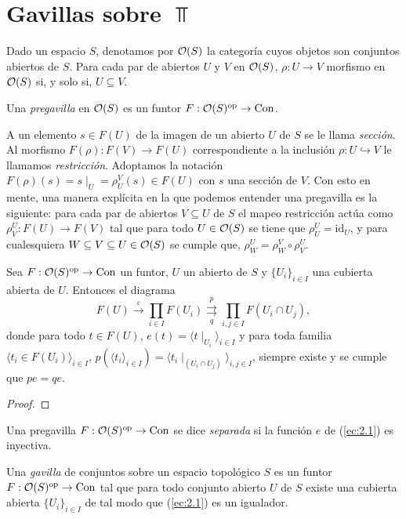 \section{Gavillas sobre $\Top$}
Dado un espacio $S$, denotamos por ${\mathcal O}(S)$ la categoría cuyos objetos son conjuntos abiertos de $S$. Para cada par de abiertos $U$ y $V$ en ${\mathcal O}(S)$, $\rho:U\to V$ morfismo en ${\mathcal O}(S)$ si, y solo si, $U\subseteq V$.
\begin{definition}[Pregavilla]
    Una \emph{pregavilla} en ${\mathcal O}(S)$ es un funtor $F:{\mathcal O}(S)^{\mathrm{op}}\to{\mathrm{Con}}$.
\end{definition}
A un elemento $s\in F(U)$ de la imagen de un abierto $U$ de $S$ se le llama \emph{sección}. Al morfismo $F(\rho):F(V)\to F(U)$ correspondiente a la inclusión $\rho:U\hookrightarrow V$ le llamamos \emph{restricción}. Adoptamos la notación $F(\rho)(s)=s\mid_U=\rho^V_U(s)\in F(U)$ con $s$ una sección de $V$. Con esto en mente, una manera explícita en la que podemos entender una pregavilla es la siguiente: para cada par de abiertos $V\subseteq U$ de $S$ el mapeo restricción actúa como $\rho_V^U: F(U)\to F(V)$ tal que para todo $U\in{\mathcal O}(S)$ se  tiene que $\rho_U^U=\mathrm{id}_U$, y para cualesquiera $W\subseteq V\subseteq U\in{\mathcal O}(S)$ se cumple que, $\rho_W^U=\rho_W^V\circ\rho_V^U$.
\begin{lema}
    Sea $F:{\mathcal O}(S)^{\mathrm{op}}\to{\mathrm{Con}}$ un funtor, $U$ un abierto de $S$ y $\{U_i\}_{i\in I}$ una cubierta abierta de $U$. Entonces el diagrama 
    \begin{equation}\label{ec:2.1}
        F(U)\xrightarrow{\varepsilon}\prod_{i\in I} F(U_i)\overset{p}{\underset{q}{\rightrightarrows}}\prod_{i,j\in I}F(U_i\cap U_j),
    \end{equation}
    donde para todo $t\in F(U)$, $e(t)=\langle t\mid_{U_i}\rangle_{i\in I}$ y para toda familia $\langle t_i\in F(U_i)\rangle_{i\in I}$, $p(\langle t_i\rangle_{i\in I})=\langle t_i\mid_{(U_i\cap U_j)}\rangle_{i,j\in I}$, siempre existe y se cumple que $pe=qe$.
\end{lema}
\begin{proof}

\end{proof}
\begin{definition} Una pregavilla $F:{\mathcal O}(S)^{{\mathrm{op}}}\to{\mathrm{Con}}$ se dice \emph{separada} si la función $e$ de (\ref{ec:2.1}) es inyectiva. 
\end{definition}
\begin{definition}[Gavilla]
    Una \emph{gavilla} de conjuntos sobre un espacio topológico $S$ es un funtor $F:{\mathcal O}(S)^{\mathrm{op}}\to{\mathrm{Con}}$ tal que para todo conjunto abierto $U$ de $S$ existe una cubierta abierta $\{U_i\}_{i\in I}$ de tal modo que (\ref{ec:2.1}) es un igualador.  
\end{definition}
